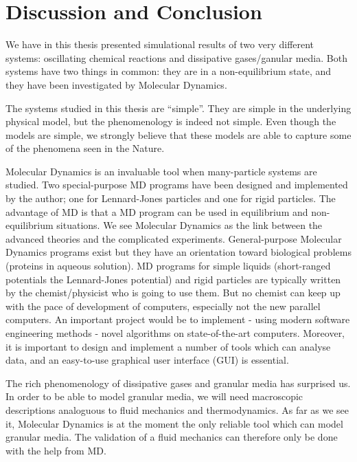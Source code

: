 
\chapter{Discussion and Conclusion}
\label{chap:Conclusion}

We have in this thesis presented simulational results of two very
different systems: oscillating chemical reactions and dissipative
gases/ganular media.
Both systems have two things in common: they are in a non-equilibrium
state, and they have been investigated by Molecular Dynamics.

The systems studied in this thesis are ``simple''. They are simple in
the underlying physical model, but the phenomenology is indeed not
simple. Even though the models are simple, we strongly believe that
these models are able to capture some of the phenomena seen in the Nature.

Molecular Dynamics is an invaluable tool when many-particle systems are
studied. Two special-purpose MD programs have been designed and
implemented by the author; one for Lennard-Jones particles and one for
rigid particles. The advantage of MD is that a MD program can be used
in equilibrium and non-equilibrium situations. We see Molecular
Dynamics as the link between the advanced theories and the complicated
experiments. General-purpose Molecular Dynamics programs exist but they
have an orientation toward biological problems (proteins in aqueous
solution). MD programs for simple liquids (short-ranged 
potentials \eg the Lennard-Jones potential) and rigid particles are
typically written by the chemist/physicist who is going to use them.
But no chemist can keep up with
the pace of development of computers, especially not the new parallel
computers. An important project would be to implement - using modern
software engineering methods - novel algorithms on state-of-the-art
computers. Moreover, it is important to design and implement a number of
tools which can analyse data, and an easy-to-use graphical user interface
(GUI) is essential.

The rich phenomenology of dissipative gases and granular media has
surprised us. In order to be able to model granular media, we will need
macroscopic descriptions analoguous to fluid mechanics and
thermodynamics. As far as we see it, Molecular Dynamics is at the
moment the only reliable tool which can model granular media. The
validation of a fluid mechanics can therefore only be done with the
help from MD.

